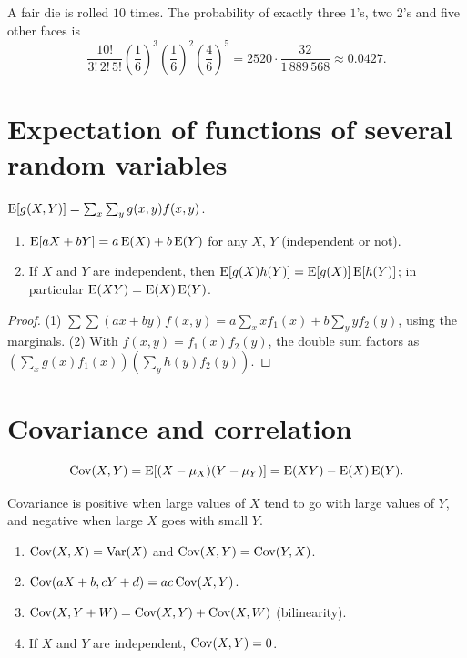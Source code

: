 \begin{example}[Dice]
A fair die is rolled $10$ times. The probability of exactly three $1$'s, two $2$'s and
five other faces is
\[
  \frac{10!}{3!\,2!\,5!}\left(\frac16\right)^3\left(\frac16\right)^2\left(\frac46\right)^5
  = 2520\cdot\frac{32}{1\,889\,568} \approx 0.0427.
\]
\end{example}

\section{Expectation of functions of several random variables}

\begin{definition}
$\operatorname{E}[g(X,Y)] = \sum_x\sum_y g(x,y)f(x,y)$.
\end{definition}

\begin{theorem}[Properties]
\begin{enumerate}
  \item $\operatorname{E}[aX + bY] = a\operatorname{E}(X) + b\operatorname{E}(Y)$ for any $X$, $Y$ (independent or not).
  \item If $X$ and $Y$ are independent, then $\operatorname{E}[g(X)h(Y)] = \operatorname{E}[g(X)]\operatorname{E}[h(Y)]$; in
        particular $\operatorname{E}(XY) = \operatorname{E}(X)\operatorname{E}(Y)$.
\end{enumerate}
\end{theorem}

\begin{proof}
(1) $\sum\sum(ax+by)f(x,y) = a\sum_x x f_1(x) + b\sum_y yf_2(y)$, using the marginals.
(2) With $f(x,y) = f_1(x)f_2(y)$, the double sum factors as
$\left(\sum_x g(x)f_1(x)\right)\left(\sum_y h(y)f_2(y)\right)$.
\end{proof}

\section{Covariance and correlation}

\begin{definition}[Covariance]
\[
  \operatorname{Cov}(X,Y) = \operatorname{E}[(X-\mu_X)(Y-\mu_Y)] = \operatorname{E}(XY) - \operatorname{E}(X)\operatorname{E}(Y).
\]
\end{definition}

Covariance is positive when large values of $X$ tend to go with large values of $Y$, and
negative when large $X$ goes with small $Y$.

\begin{theorem}
\begin{enumerate}
  \item $\operatorname{Cov}(X,X) = \operatorname{Var}(X)$ and $\operatorname{Cov}(X,Y) = \operatorname{Cov}(Y,X)$.
  \item $\operatorname{Cov}(aX+b, cY+d) = ac\operatorname{Cov}(X,Y)$.
  \item $\operatorname{Cov}(X, Y+W) = \operatorname{Cov}(X,Y) + \operatorname{Cov}(X,W)$ (bilinearity).
  \item If $X$ and $Y$ are independent, $\operatorname{Cov}(X,Y) = 0$.
\end{enumerate}
\end{theorem}

